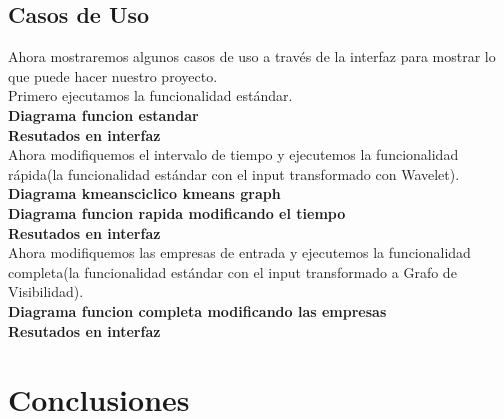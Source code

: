 \documentclass[12pt,a4paper]{article}
\begin{document}
	\subsection{Casos de Uso}
	
	Ahora mostraremos algunos casos de uso a través de la interfaz para mostrar lo que puede hacer nuestro proyecto.\\
	Primero ejecutamos la funcionalidad estándar.\\
	\textbf{Diagrama funcion estandar }\\
	\textbf{Resutados en interfaz}\\
	Ahora modifiquemos el intervalo de tiempo y ejecutemos la funcionalidad rápida(la funcionalidad estándar con el input transformado con Wavelet).\\
	\textbf{Diagrama kmeansciclico kmeans graph}\\
	\textbf{Diagrama funcion rapida modificando el tiempo}\\
	\textbf{Resutados en interfaz}\\
	
	Ahora modifiquemos las empresas de entrada y ejecutemos la funcionalidad completa(la funcionalidad estándar con el input transformado a Grafo de Visibilidad).\\
	\textbf{Diagrama funcion completa modificando las empresas}\\
	\textbf{Resutados en interfaz}\\
\pagebreak

	\section{Conclusiones}
	
\pagebreak
\end{document}

